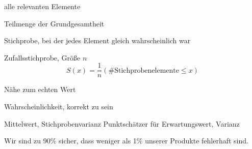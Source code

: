 \documentclass{beamer}
\begin{document}
\begin{frame}{\insertsection}
\begin{definition}
	\begin{description}[Zufallsstichprobe]
	\item[Grundgesamtheit] alle relevanten Elemente
	\item[Stichprobe] Teilmenge der Grundgesamtheit
	\item[Zufallsstichprobe] Stichprobe, bei der jedes Element gleich wahrscheinlich war
	\item[] 
	\end{description}
\end{definition}
\begin{definition}
	Zufallsstichprobe, Größe $n$
	\begin{equation*}
	S(x) = \frac{1}{n}(\text{\#Stichprobenelemente}\leq x)
	\end{equation*}
\end{definition}
\end{frame}

\begin{frame}{\insertsection}
\begin{definition}
	\begin{description}[Zuverlässigkeit]
	\item[Präzision] Nähe zum echten Wert
	\item[Zuverlässigkeit] Wahrscheinlichkeit, korrekt zu sein
	\end{description}
\end{definition}
\begin{example}
	\begin{description}[Beispiele]
	\item[Beispiele] Mittelwert, Stichprobenvarianz Punktschätzer für Erwartungswert, Varianz
	\end{description}
\end{example}
\begin{example}
	\begin{description}[Beispiele]
	\item[Beispiel] \glqq Wir sind zu 90\% sicher, dass weniger als 1\% unserer Produkte fehlerhaft sind\grqq.
	\end{description}
\end{example}
\end{frame}
\end{document}
